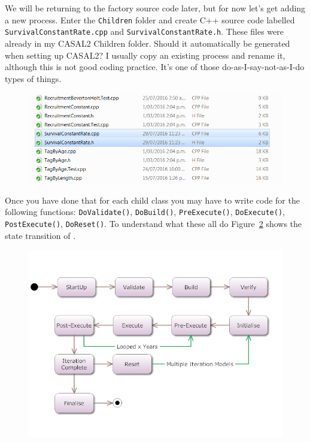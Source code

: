 We will be returning to the factory source code later{\color{red},} but for now {\color{red}let's} get adding a new process. Enter the \texttt{Children} folder and create C++ source code labelled \texttt{SurvivalConstantRate.cpp} and \texttt{SurvivalConstantRate.h}. {\color{red}These files were already in my CASAL2 Children folder. Should it automatically be generated when setting up CASAL2?} I usually copy an existing process and rename it, although this is not good coding practice. It's one of those {\color{red}do-as-I-say-not-as-I-do} types of things.
\begin{figure}[!ht]
	\centering
	\includegraphics[scale=0.6]{Figures/add_survival.png}
	\caption{}\label{fig:process2}
\end{figure}

{\color{red}Once} you have done that for each child class you may have to write code for the following functions{\color{red}:} \texttt{DoValidate()}, \texttt{DoBuild()}, \texttt{PreExecute()}, \texttt{DoExecute()}, \texttt{PostExecute()}, \texttt{DoReset()}. To understand what these all do Figure~\ref{fig:flow} shows the state transition of \CNAME.
\raggedbottom
\begin{figure}[!ht]
	\centering
	\includegraphics[scale=0.6]{Figures/State-Transition.png}
	\caption{}\label{fig:flow}
\end{figure}

